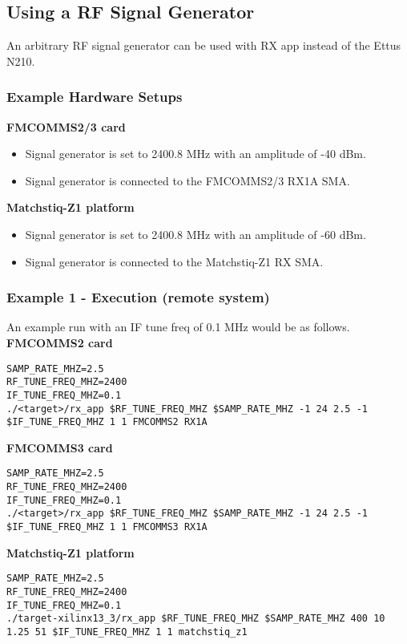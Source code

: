 
\subsection{Using a RF Signal Generator}
\noindent An arbitrary RF signal generator can be used with RX app instead of the Ettus N210. \\

\subsubsection{Example Hardware Setups}
\noindent\textbf{FMCOMMS2/3 card}
\begin{itemize}
  \item Signal generator is set to 2400.8 MHz with an amplitude of -40 dBm.
  \item Signal generator is connected to the FMCOMMS2/3 RX1A SMA.
\end{itemize}
\noindent\textbf{Matchstiq-Z1 platform}
\begin{itemize}
  \item Signal generator is set to 2400.8 MHz with an amplitude of -60 dBm.
  \item Signal generator is connected to the Matchstiq-Z1 RX SMA.
\end{itemize}
\pagebreak
\subsubsection{Example 1 - Execution (remote system)}
An example run with an IF tune freq of 0.1 MHz would be as follows.
\\\noindent\textbf{FMCOMMS2 card}
\begin{lstlisting}
SAMP_RATE_MHZ=2.5
RF_TUNE_FREQ_MHZ=2400
IF_TUNE_FREQ_MHZ=0.1
./<target>/rx_app $RF_TUNE_FREQ_MHZ $SAMP_RATE_MHZ -1 24 2.5 -1 $IF_TUNE_FREQ_MHZ 1 1 FMCOMMS2 RX1A
\end{lstlisting}
\noindent\textbf{FMCOMMS3 card}
\begin{lstlisting}
SAMP_RATE_MHZ=2.5
RF_TUNE_FREQ_MHZ=2400
IF_TUNE_FREQ_MHZ=0.1
./<target>/rx_app $RF_TUNE_FREQ_MHZ $SAMP_RATE_MHZ -1 24 2.5 -1 $IF_TUNE_FREQ_MHZ 1 1 FMCOMMS3 RX1A
\end{lstlisting}
\noindent\textbf{Matchstiq-Z1 platform}
\begin{lstlisting}
SAMP_RATE_MHZ=2.5
RF_TUNE_FREQ_MHZ=2400
IF_TUNE_FREQ_MHZ=0.1
./target-xilinx13_3/rx_app $RF_TUNE_FREQ_MHZ $SAMP_RATE_MHZ 400 10 1.25 51 $IF_TUNE_FREQ_MHZ 1 1 matchstiq_z1
\end{lstlisting}
